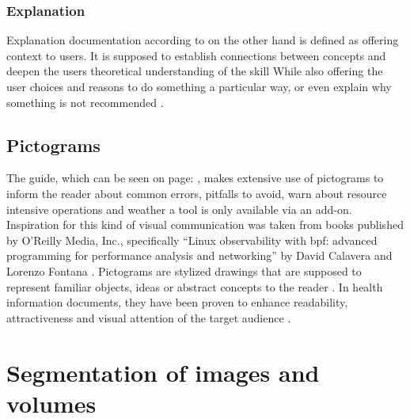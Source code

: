 \subsubsection*{Explanation}
Explanation documentation according to \citeauthor{procidaDiataxisDocumentationFramework2023} on the other hand is defined as offering context to users.
It is supposed to establish connections between concepts and deepen the users theoretical understanding of the skill
While also offering the user choices and reasons to do something a particular way, or even explain why something is not recommended \cite{procidaPythonDocsCommunity2022,procidaDiataxisDocumentationFramework2023}.

\subsection{Pictograms}
\label{s:b-pictograms}
The guide, which can be seen on page: \pageref{a:guide}, makes extensive use of pictograms to inform the reader about common errors, pitfalls to avoid, warn about resource intensive operations and weather a tool is only available via an add-on.
Inspiration for this kind of visual communication was taken from books published by O'Reilly Media, Inc., specifically ``Linux observability with \acrshort{bpf}: advanced programming for performance analysis and networking'' by David Calavera and Lorenzo Fontana \cite{calaveraLinuxObservabilityBPF2019}.
Pictograms are stylized drawings that are supposed to represent familiar objects, ideas or abstract concepts to the reader \cite{dowsePharmacistsAreWords2021}.
In health information documents, they have been proven to enhance readability, attractiveness and visual attention of the target audience \cite{houtsRolePicturesImproving2006,mansoorEffectPictogramsReadability2003}.\\

\section{Segmentation of images and volumes}
\label{s:b-segmentation-basics}


